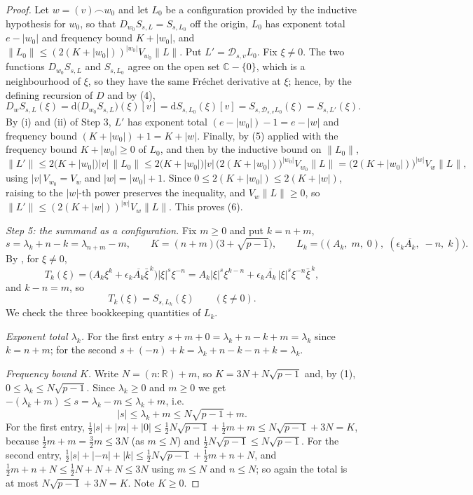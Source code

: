 \begin{proof}
Let $w=(v)\frown w_0$ and let $L_0$ be a configuration provided by the
inductive hypothesis for $w_0$, so that $D_{w_0}S_{s,L}=S_{s,L_0}$ off the
origin, $L_0$ has exponent total $e-|w_0|$ and frequency bound $K+|w_0|$, and
$\|L_0\|\le(2(K+|w_0|))^{|w_0|}V_{w_0}\|L\|$.  Put
$L'=\mathcal{D}_{s,v}L_0$.  Fix $\xi\ne0$.  The two functions
$D_{w_0}S_{s,L}$ and $S_{s,L_0}$ agree on the open set $\mathbb{C}-\{0\}$,
which is a neighbourhood of $\xi$, so they have the same Fr\'echet derivative
at $\xi$; hence, by the defining recursion of $D$ and by (4),
\[
  D_wS_{s,L}(\xi)=\mathrm{d}\bigl(D_{w_0}S_{s,L}\bigr)(\xi)[v]
  =\mathrm{d}S_{s,L_0}(\xi)[v]=S_{s,\mathcal{D}_{s,v}L_0}(\xi)=S_{s,L'}(\xi).
\]
By (i) and (ii) of Step 3, $L'$ has exponent total
$(e-|w_0|)-1=e-|w|$ and frequency bound $(K+|w_0|)+1=K+|w|$.  Finally, by (5)
applied with the frequency bound $K+|w_0|\ge0$ of $L_0$, and then by the
inductive bound on $\|L_0\|$,
\[
  \|L'\|\le2\bigl(K+|w_0|\bigr)|v|\,\|L_0\|
  \le2\bigl(K+|w_0|\bigr)|v|\,
     \bigl(2(K+|w_0|)\bigr)^{|w_0|}V_{w_0}\|L\|
  =\bigl(2(K+|w_0|)\bigr)^{|w|}V_{w}\|L\| ,
\]
using $|v|\,V_{w_0}=V_w$ and $|w|=|w_0|+1$.  Since
$0\le2(K+|w_0|)\le2(K+|w|)$, raising to the $|w|$-th power preserves the
inequality, and $V_w\|L\|\ge0$, so
$\|L'\|\le(2(K+|w|))^{|w|}V_w\|L\|$.  This proves (6).

\emph{Step 5: the summand as a configuration.}  Fix $m\ge0$ and put $k=n+m$,
\[
  s=\lambda_k+n-k=\lambda_{n+m}-m,\qquad
  K=(n+m)\bigl(3+\sqrt{p-1}\bigr),\qquad
  L_k=\bigl((A_k,\;m,\;0),\;(\epsilon_k\overline{A_k},\;-n,\;k)\bigr).
\]
By , for $\xi\ne0$,
\[
  T_k(\xi)=\bigl(A_k\xi^{k}+\epsilon_k\overline{A_k}\bar\xi^{\,k}\bigr)
    |\xi|^{s}\xi^{-n}
  =A_k|\xi|^{s}\xi^{k-n}
   +\epsilon_k\overline{A_k}\,|\xi|^{s}\xi^{-n}\bar\xi^{\,k},
\]
and $k-n=m$, so
\begin{equation}\tag{7}
  T_k(\xi)=S_{s,L_k}(\xi)\qquad(\xi\ne0).
\end{equation}
We check the three bookkeeping quantities of $L_k$.

\emph{Exponent total $\lambda_k$.}  For the first entry
$s+m+0=\lambda_k+n-k+m=\lambda_k$ since $k=n+m$; for the second
$s+(-n)+k=\lambda_k+n-k-n+k=\lambda_k$.

\emph{Frequency bound $K$.}  Write $N=(n:\mathbb{R})+m$, so $K=3N+N\sqrt{p-1}$
and, by (1), $0\le\lambda_k\le N\sqrt{p-1}$.  Since $\lambda_k\ge0$ and
$m\ge0$ we get $-( \lambda_k+m)\le s=\lambda_k-m\le\lambda_k+m$, i.e.
\begin{equation}\tag{8}
  |s|\le\lambda_k+m\le N\sqrt{p-1}+m .
\end{equation}
For the first entry, $\tfrac12|s|+|m|+|0|\le\tfrac12 N\sqrt{p-1}
+\tfrac12m+m\le N\sqrt{p-1}+3N=K$, because $\tfrac12m+m=\tfrac32m\le3N$ (as
$m\le N$) and $\tfrac12N\sqrt{p-1}\le N\sqrt{p-1}$.  For the second entry,
$\tfrac12|s|+|-n|+|k|\le\tfrac12N\sqrt{p-1}+\tfrac12m+n+N$, and
$\tfrac12m+n+N\le\tfrac12N+N+N\le3N$ using $m\le N$ and $n\le N$; so again the
total is at most $N\sqrt{p-1}+3N=K$.  Note $K\ge0$.


\end{proof}

